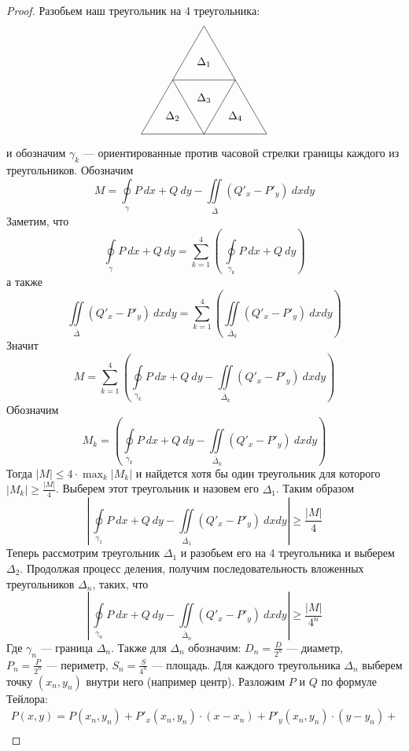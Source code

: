\begin{proof} Разобьем наш треугольник на 4 треугольника:
    \[
    \begin{tikzpicture}
        \usetikzlibrary{calc}
    \coordinate (A) at (0,0);
    \coordinate (B) at (4,0);
    \coordinate (C) at (2,3.464);
    \coordinate (D) at (2,0);
    \coordinate (E) at (3,1.732);
    \coordinate (F) at (1,1.732);
    \draw (A) -- (B) -- (C) -- cycle;
    \draw (D) -- (E) -- (F) -- cycle;
    \node at (1,0.577) {$\Delta_2$};
    \node at (3,0.577) {$\Delta_4$};
    \node at (2,2.309) {$\Delta_1$};
    \node at (2,1.155) {$\Delta_3$};
    \end{tikzpicture}
    \]
    и обозначим $\gamma_k$ --- ориентированные против часовой стрелки границы каждого из треугольников. Обозначим
    \[M=\oint\limits_{\gamma}P\ dx+Q\ dy-\iint\limits_{\overline{\Delta}}(Q'_x-P'_y)\ dxdy\]
    Заметим, что
    \[\oint\limits_{\gamma}P\ dx+Q\ dy=\sum\limits_{k=1}^{4} \left(\ \oint\limits_{\gamma_k}P\ dx+Q\ dy\right)\]
    а также
    \[\iint\limits_{\overline{\Delta}}(Q'_x-P'_y)\ dxdy=\sum\limits_{k=1}^{4}\left(\iint\limits_{\overline{\Delta}_k}(Q'_x-P'_y)\ dxdy\right)\]
    Значит
    \[M=\sum\limits_{k=1}^{4}\left(\oint\limits_{\gamma_k}P\ dx+Q\ dy-\iint\limits_{\overline{\Delta}_k}(Q'_x-P'_y)\ dxdy\right)\]
    Обозначим 
    \[M_k=\left(\oint\limits_{\gamma_k}P\ dx+Q\ dy-\iint\limits_{\overline{\Delta}_k}(Q'_x-P'_y)\ dxdy\right)\]
    Тогда $|M|\leq 4\cdot \max_k |M_k|$ и найдется хотя бы один треугольник для которого $|M_k|\geq \frac{|M|}{4}$. Выберем этот треугольник и назовем его $\Delta_1$. Таким образом
    \[\left|\ \oint\limits_{\gamma_1}P\ dx+Q\ dy-\iint\limits_{\overline{\Delta_1}}(Q'_x-P'_y)\ dxdy\right|\geq \frac{|M|}{4}\]
    Теперь рассмотрим треугольник $\Delta_1$ и разобьем его на 4 треугольника и выберем $\Delta_2$. Продолжая процесс деления, получим последовательность вложенных треугольников $\Delta_n$, таких, что
    \[\left|\ \oint\limits_{\gamma_n}P\ dx+Q\ dy-\iint\limits_{\overline{\Delta}_n}(Q'_x-P'_y)\ dxdy\right|\geq \frac{|M|}{4^n}\]
    Где $\gamma_n$ --- граница $\Delta_n$. Также для $\Delta_n$ обозначим: $D_n=\frac{D}{2^n}$ --- диаметр,\\
    $P_n=\frac{P}{2^n}$ --- периметр, $S_n=\frac{S}{4^n}$ --- площадь. Для каждого треугольника $\Delta_n$ выберем точку $(x_n,y_n)$ внутри него (например центр). Разложим $P$ и $Q$ по формуле Тейлора:
    \begin{multline*}
        P(x,y)=P(x_n,y_n)+P'_x(x_n,y_n)\cdot (x-x_n)+P'_y(x_n,y_n)\cdot (y-y_n)+\\

\end{multline*}
\end{proof}

